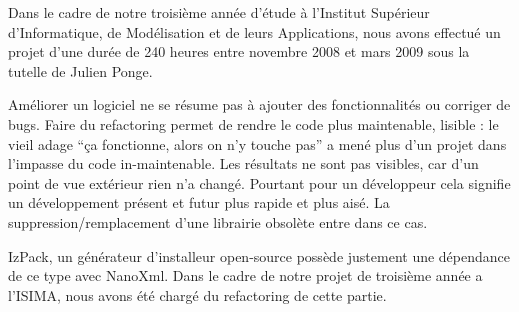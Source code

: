 Dans le cadre de notre troisième année d'étude à l'Institut Supérieur d'Informatique, de Modélisation et de leurs Applications, nous avons effectué un projet d'une durée de 240 heures entre novembre 2008 et mars 2009 sous la tutelle de Julien Ponge.

Améliorer un logiciel ne se résume pas à ajouter des fonctionnalités ou corriger de bugs.
Faire du refactoring permet de rendre le code plus maintenable, lisible : le vieil adage ``ça fonctionne, alors on n'y touche pas'' a mené plus d'un projet dans l'impasse du code in-maintenable.
Les résultats ne sont pas visibles, car d'un point de vue extérieur rien n'a changé. Pourtant pour un développeur cela signifie un développement présent et futur plus rapide et plus aisé.
La suppression/remplacement d'une librairie obsolète entre dans ce cas.

IzPack, un générateur d'installeur open-source possède justement une dépendance de ce type avec NanoXml. Dans le cadre de notre projet de troisième année a l'ISIMA, nous avons été chargé du refactoring de cette partie.
